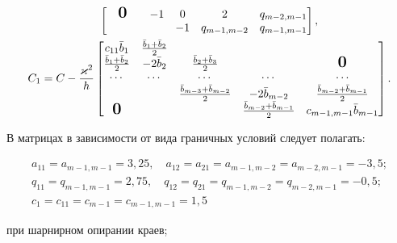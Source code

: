 \begin{gather*}
\begin{bmatrix}
 & \textbf{\Large 0} &  & -1 & 0 & 2 & q_{m-2,m-1} \\

 &  &  &  & -1 & q_{m-1,m-2} & q_{m-1,m-1} 

\end{bmatrix}, \\

\label{tri:shest:shtrih:tri}

C_1=C- \frac{\varkappa^2}{h}

\begin{bmatrix}

c_{11}\bar{b}_1 & \frac{\bar{b}_1+\bar{b}_2}{2} &  &  & \\

\frac{\bar{b}_1+\bar{b}_2}{2} & -2\bar{b}_2 & \frac{\bar{b}_2+\bar{b}_3}{2} &  & \textbf{\Large 0} \\

\cdots  & \cdots & \cdots & \cdots& \cdots  \\

 &  & \frac{\bar{b}_{m-3}+\bar{b}_{m-2}}{2} & -2\bar{b}_{m-2} & \frac{\bar{b}_{m-2}+\bar{b}_{m-1}}{2} \\

\textbf{\Large 0} &  & & \frac{\bar{b}_{m-2}+\bar{b}_{m-1}}{2} & c_{m-1,m-1}\bar{b}_{m-1} 

\end{bmatrix}. 

\end{gather*}




В матрицах в зависимости от вида граничных условий следует полагать:

$$

\begin{array}{l}

 a_{11}=a_{m-1,m-1}=3,25,\quad a_{12}=a_{21}=a_{m-1,m-2}=a_{m-2,m-1}=-3,5; 

\\

q_{11}=q_{m-1,m-1}=2,75,\quad  q_{12}=q_{21}=q_{m-1,m-2}=q_{m-2,m-1}=-0,5;

\\

c_1=c_{11}=c_{m-1}=c_{m-1,m-1}=1,5 

\end{array}

$$

при шарнирном опирании краев;

